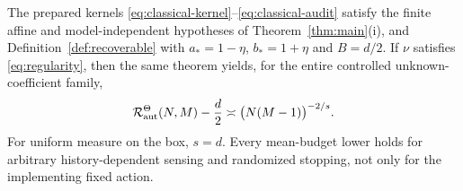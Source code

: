 \begin{theorem}\label{thm:classical}
The prepared kernels \eqref{eq:classical-kernel}--\eqref{eq:classical-audit} satisfy the finite affine and model-independent hypotheses of Theorem~\ref{thm:main}(i), and Definition~\ref{def:recoverable} with $a_*=1-\eta$, $b_*=1+\eta$ and $B=d/2$. If $\nu$ satisfies \eqref{eq:regularity}, then the same theorem yields, for the entire controlled unknown-coefficient family,
\begin{equation}\label{eq:classical-rate}
 \mathcal R_{\mathrm{aut}}^\Theta(N,M)-\frac d2
       \asymp \bigl(N(M-1)\bigr)^{-2/s}.
\end{equation}
For uniform measure on the box, $s=d$. Every mean-budget lower holds for arbitrary history-dependent sensing and randomized stopping, not only for the implementing fixed action.
\end{theorem}
